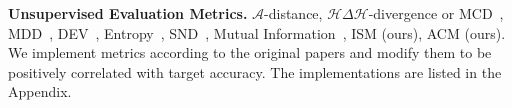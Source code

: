 \documentclass{article} %
\begin{document}

\textbf{Unsupervised Evaluation Metrics.} $\mathcal{A}$-distance\cite{BenDavidA}, $\mathcal{H} \Delta \mathcal{H}$-divergence or MCD~\cite{BenDavidH,MCD}, MDD~\cite{MDD}, DEV~\cite{DEV}, Entropy~\cite{SSLEntropy, ADVENT}, SND~\cite{SND}, Mutual Information~\cite{MI}, ISM (ours), ACM (ours). We implement metrics according to the original papers and modify them to be positively correlated with target accuracy. The implementations are listed in the Appendix.
\end{document}
